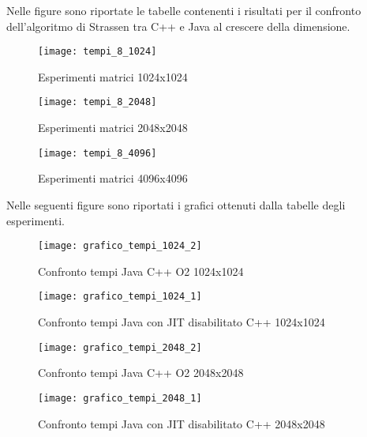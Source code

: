 Nelle figure sono riportate le tabelle contenenti i risultati per il confronto
dell'algoritmo di Strassen tra C++ e Java al crescere della dimensione. \\

\begin{figure}[!htbp]
  \texttt{[image: tempi\_8\_1024]}
  \caption{Esperimenti matrici 1024x1024}
  \label{tempi_8_1024}
\end{figure}

\begin{figure}[!htbp]
  \texttt{[image: tempi\_8\_2048]}
  \caption{Esperimenti matrici 2048x2048}
  \label{tempi_8_2048}
\end{figure}

\begin{figure}[!htbp]
  \texttt{[image: tempi\_8\_4096]}
  \caption{Esperimenti matrici 4096x4096}
  \label{tempi_8_4096}
\end{figure}

\clearpage

Nelle seguenti figure sono riportati i grafici ottenuti dalla tabelle degli esperimenti.\\

\begin{figure}[!htbp]
  \texttt{[image: grafico\_tempi\_1024\_2]}
  \caption{Confronto tempi Java C++ O2 1024x1024}
  \label{grafico_tempi_1024_2}
\end{figure}

\begin{figure}[!htbp]
  \texttt{[image: grafico\_tempi\_1024\_1]}
  \caption{Confronto tempi Java con JIT disabilitato C++ 1024x1024}
  \label{grafico_tempi_1024_1}
\end{figure}

\begin{figure}[!htbp]
  \texttt{[image: grafico\_tempi\_2048\_2]}
  \caption{Confronto tempi Java C++ O2 2048x2048}
  \label{grafico_tempi_2048_2}
\end{figure}

\begin{figure}[!htbp]
  \texttt{[image: grafico\_tempi\_2048\_1]}
  \caption{Confronto tempi Java con JIT disabilitato C++ 2048x2048}
  \label{grafico_tempi_2048_1}
\end{figure}

